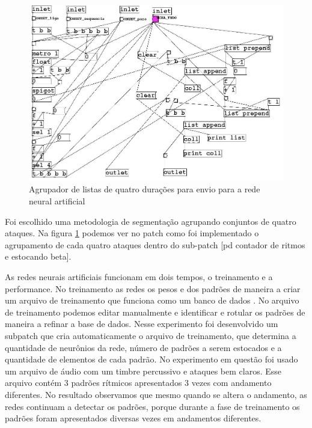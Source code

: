 \documentclass[draft]{ppgmus}
\begin{document}
  
\begin{figure}
\includegraphics[scale=.4]{fann2}
\caption{Agrupador de listas de quatro durações para envio para a rede neural artificial}
\label{fann2}
\end{figure} 

Foi escolhido uma metodologia de segmentação agrupando conjuntos de quatro ataques. 
Na figura \ref{fann2} podemos ver no patch como foi implementado 
o agrupamento de cada quatro  ataques dentro do sub-patch [pd contador de ritmos e estocando beta].

As redes neurais artificiais funcionam em dois tempos, o treinamento e a performance. No treinamento as redes os pesos e 
dos padrões de maneira a criar um arquivo de treinamento que funciona como um banco de dados . No arquivo de treinamento 
podemos editar manualmente e identificar e rotular os padrões de maneira a refinar a base de dados. Nesse experimento foi 
desenvolvido um subpatch que cria automaticamente o arquivo de treinamento, que determina a quantidade de neurônios da 
rede, número de padrões a serem estocados e a quantidade de elementos de cada padrão.
   No experimento em questão foi usado um arquivo de áudio com um timbre percussivo e ataques bem claros. Esse arquivo 
contém 3 padrões rítmicos apresentados 3 vezes com  andamento diferentes. No resultado observamos que mesmo quando se 
altera o andamento, as redes continuam a detectar os padrões, porque durante a fase de treinamento os padrões foram 
apresentados diversas vezes em andamentos diferentes.
\end{document}
